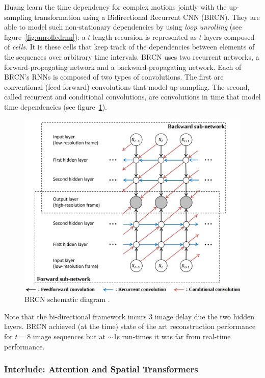 
Huang \etal \cite{huang2015bidirectional} learn the time dependency for complex motions jointly with the up-sampling transformation using a Bidirectional Recurrent CNN (BRCN). 
%
%
They are able to model such non-stationary dependencies by using \textit{loop unrolling} (see figure~\ref{fig:unrolledrnn}): a \(t\) length recursion is represented as \(t\) layers composed of \textit{cells}.
%
It is these cells that keep track of the dependencies between elements of the sequences over arbitrary time intervals.
%
%
BRCN uses two recurrent networks, a forward-propagating network and a backward-propagating network.
%
Each of BRCN's RNNs is composed of two types of convolutions. 
%
The first are conventional (feed-forward) convolutions that model up-sampling.
%
The second, called recurrent and conditional convolutions, are convolutions in time that model time dependencies (see figure~\ref{fig:brcn}).
\begin{figure}[!htbp]
    \includegraphics[width=.49\textwidth]{figures/neural_networks/brcn.png}
    \caption{BRCN schematic diagram \cite{huang2015bidirectional}.}\label{fig:brcn}
\end{figure}
%
Note that the bi-directional framework incurs 3 image delay due the two hidden layers.
%
BRCN achieved (at the time) state of the art reconstruction performance for \(t=8\) image sequences but at \(\sim\)1s run-times it was far from real-time performance.




\subsubsection{Interlude: Attention and Spatial Transformers}\label{subsubsec:spatialtrans}


